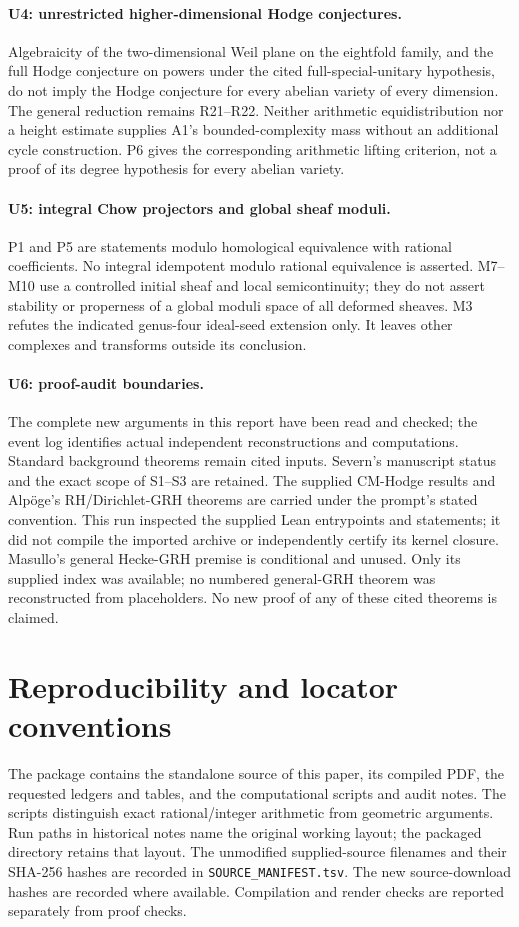 \paragraph{U4: unrestricted higher-dimensional Hodge conjectures.}
Algebraicity of the two-dimensional Weil plane on the eightfold family, and the full Hodge conjecture on powers under the cited full-special-unitary hypothesis, do not imply the Hodge conjecture for every abelian variety of every dimension. The general reduction remains R21--R22. Neither arithmetic equidistribution nor a height estimate supplies A1's bounded-complexity mass without an additional cycle construction. P6 gives the corresponding arithmetic lifting criterion, not a proof of its degree hypothesis for every abelian variety.

\paragraph{U5: integral Chow projectors and global sheaf moduli.}
P1 and P5 are statements modulo homological equivalence with rational coefficients. No integral idempotent modulo rational equivalence is asserted. M7--M10 use a controlled initial sheaf and local semicontinuity; they do not assert stability or properness of a global moduli space of all deformed sheaves. M3 refutes the indicated genus-four ideal-seed extension only. It leaves other complexes and transforms outside its conclusion.

\paragraph{U6: proof-audit boundaries.}
The complete new arguments in this report have been read and checked; the event log identifies actual independent reconstructions and computations. Standard background theorems remain cited inputs. Severn's manuscript status and the exact scope of S1--S3 are retained. The supplied CM-Hodge results and Alp\"oge's RH/Dirichlet-GRH theorems are carried under the prompt's stated convention. This run inspected the supplied Lean entrypoints and statements; it did not compile the imported archive or independently certify its kernel closure. Masullo's general Hecke-GRH premise is conditional and unused. Only its supplied index was available; no numbered general-GRH theorem was reconstructed from placeholders. No new proof of any of these cited theorems is claimed.

\section{Reproducibility and locator conventions}
The package contains the standalone source of this paper, its compiled PDF, the requested ledgers and tables, and the computational scripts and audit notes. The scripts distinguish exact rational/integer arithmetic from geometric arguments. Run paths in historical notes name the original working layout; the packaged  directory retains that layout. The unmodified supplied-source filenames and their SHA-256 hashes are recorded in \texttt{SOURCE\_MANIFEST.tsv}. The new source-download hashes are recorded where available. Compilation and render checks are reported separately from proof checks.

